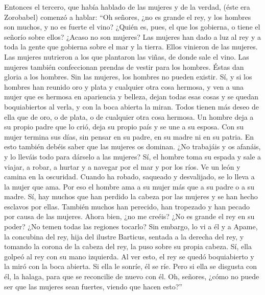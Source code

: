  Entonces el tercero, que había hablado de las mujeres y
de la verdad, (éste era Zorobabel) comenzó a hablar: 
``Oh señores, ¿no es grande el rey, y los hombres son muchos, y no es
fuerte el vino? ¿Quién es, pues, el que los gobierna, o tiene el señorío
sobre ellos? ¿Acaso no son mujeres?  Las mujeres han dado
a luz al rey y a toda la gente que gobierna sobre el mar y la tierra.
 Ellos vinieron de las mujeres. Las mujeres nutrieron a
los que plantaron las viñas, de donde sale el vino.  Las
mujeres también confeccionan prendas de vestir para los hombres. Éstas
dan gloria a los hombres. Sin las mujeres, los hombres no pueden
existir.  Sí, y si los hombres han reunido oro y plata y
cualquier otra cosa hermosa, y ven a una mujer que es hermosa en
apariencia y belleza,  dejan todas esas cosas y se quedan
boquiabiertos al verla, y con la boca abierta la miran. Todos tienen más
deseo de ella que de oro, o de plata, o de cualquier otra cosa hermosa.
 Un hombre deja a su propio padre que lo crió, deja su
propio país y se une a su esposa.  Con su mujer termina
sus días, sin pensar en su padre, en su madre ni en su patria.
 En esto también debéis saber que las mujeres os dominan.
¿No trabajáis y os afanáis, y lo lleváis todo para dárselo a las
mujeres?  Sí, el hombre toma su espada y sale a viajar, a
robar, a hurtar y a navegar por el mar y por los ríos. 
Ve un león y camina en la oscuridad. Cuando ha robado, saqueado y
desvalijado, se lo lleva a la mujer que ama.  Por eso el
hombre ama a su mujer más que a su padre o a su madre. 
Sí, hay muchos que han perdido la cabeza por las mujeres y se han hecho
esclavos por ellas.  También muchos han perecido, han
tropezado y han pecado por causa de las mujeres.  Ahora
bien, ¿no me creéis? ¿No es grande el rey en su poder? ¿No temen todas
las regiones tocarlo?  Sin embargo, lo vi a él y a Apame,
la concubina del rey, hija del ilustre Barticus, sentada a la derecha
del rey,  y tomando la corona de la cabeza del rey, la
puso sobre su propia cabeza. Sí, ella golpeó al rey con su mano
izquierda.  Al ver esto, el rey se quedó boquiabierto y
la miró con la boca abierta. Si ella le sonríe, él se ríe. Pero si ella
se disgusta con él, la halaga, para que se reconcilie de nuevo con él.
 Oh, señores, ¿cómo no puede ser que las mujeres sean
fuertes, viendo que hacen esto?''

